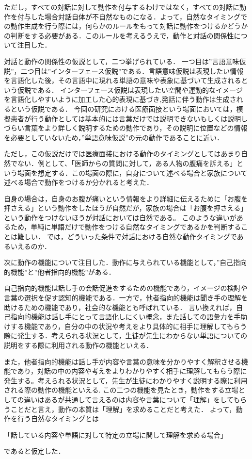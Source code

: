 ただし，すべての対話に対して動作を付与するわけではなく，すべての対話に動作を付与した場合対話自体が不自然なものになる．よって，自然なタイミングでの動作生成を行う際には，何らかのルールをもって対話に動作をつけるかどうかの判断をする必要がある．このルールを考えるうえで，動作と対話の関係性について注目した．
\par
対話と動作の関係性の仮説として，二つ挙げられている． 一つ目は”言語意味仮説”，二つ目は”インターフェース仮説”である．言語意味仮説は表現したい情報を言語化した後，その言語中に現れる単語の意味や表象に基づいて生成されるという仮説である． インターフェース仮説は表現したい空間や運動的なイメージを言語化しやすいように加工した心的表現に基づき,発話に伴う動作は生成されるという仮説である．  
今回の研究における医療面接という場面においては，模擬患者が行う動作としては基本的には言葉だけでは説明できないもしくは説明しづらい言葉をより詳しく説明するための動作であり，その説明に位置などの情報を必要としていないため，”単語意味仮説”の元の動作であることに近い．
\par
ただし，この仮説だけでは医療面接における動作のタイミングとしてはあまり自然でない．例として、「医師からの質問に対して，ある人物の腹痛を訴える」という場面を想定する．この場面の際に，自身について述べる場合と家族について述べる場合で動作をつけるか分かれると考えた．
\par
自身の場合は，自身のお腹が痛いという情報をより詳細に伝えるために「お腹を押さえる」という動作をしたほうが自然だが，家族の場合は「お腹を押さえる」という動作をつけないほうが対話においては自然である。
このような違いがあるため，単純に単語だけで動作をつける自然なタイミングであるかを判断することは難しい．
では，どういった条件で対話における自然な動作タイミングであるいえるのか．
\par
次に動作の機能について注目した．動作に与えられている機能として，”自己指向的機能”と”他者指向的機能”がある．   
\par
自己指向的機能は話し手の会話促進をするための機能であり，イメージの検討や言葉の選択を促す認知的機能である．一方で，他者指向的機能は聞き手の理解を助けるための機能であり，社会的な機能とも呼ばれている．
言い換えれば，自己指向的機能は話し手にとって言語化しにくい概念，また話しての語彙力を手助けする機能であり，自分の中の状況や考えをより具体的に相手に理解してもらう際に発生する．考えられる状況として，生徒が先生にわからない単語についての説明をする際に利用される動作の機能といえる．
\par
また，他者指向的機能は話し手が内容や言葉の意味を分かりやすく解釈させる機能であり，対話の中の内容や考えをよりわかりやすく相手に理解してもらう際に発生する。考えられる状況として，先生が生徒にわかりやすく説明する際に利用される際の動作の機能といえる.
この二つの機能を見たとき，動作をする立場としての違いはあるが共通して言えるのは内容や言葉について「理解」をしてもらうことだと言え，動作の本質は「理解」を求めることだと考えた．
よって，動作を行う自然なタイミングとは
\centerline{「話している内容や単語に対して特定の立場に関して理解を求める場合」}
であると仮定した．

